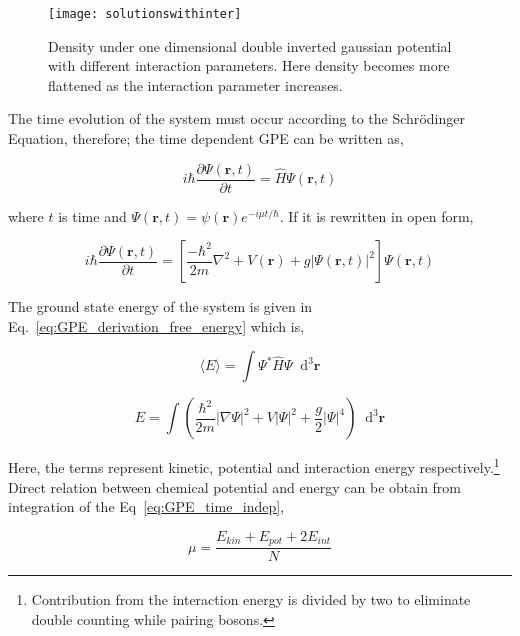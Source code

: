 \documentclass[a4paper,times,hidelinks,12pt]{article}
\newcommand*\dif{\mathop{}\!\mathrm{d}}
\begin{document}
\graphicspath{{"../figs/potentials/"}}
\begin{figure}[H]
    \centering
    \texttt{[image: solutionswithinter]}
    \caption{Density under one dimensional double inverted gaussian potential with different interaction parameters. Here density becomes more flattened as the interaction parameter increases.}
\label{fig:gaussian_pot_and_density}
\end{figure}


\noindent The time evolution of the system must occur according to the Schr{\"o}dinger Equation, therefore; the time dependent GPE can be written as,

\begin{equation}
\label{eq:GPE_time_evolution}
i \hbar \frac{\partial\Psi(\boldsymbol{r}, t)}{\partial t} = \hat{H}\Psi(\boldsymbol{r}, t)
\end{equation}

\noindent  where $t$ is time and $\Psi(\boldsymbol{r}, t) = \psi(\boldsymbol{r})e^{-i\mu t/\hbar} $. If it is rewritten in open form,

\begin{equation}
\label{eq:GPE_time_indep}
i \hbar \frac{\partial\Psi(\boldsymbol{r}, t)}{\partial t} = \left[\frac{-\hbar^2}{2m}\nabla^2 + V(\boldsymbol{r}) + g|\Psi(\boldsymbol{r}, t)|^2 \right] \Psi(\boldsymbol{r}, t)
\end{equation}

\noindent The ground state energy of the system is given in Eq.~\eqref{eq:GPE_derivation_free_energy} which is,

\begin{equation}
\label{eq:GPE_total_energy_general}
\langle E \rangle = \int \Psi^{*}\hat{H}\Psi \dif^3\boldsymbol{r}
\end{equation}

\begin{equation}
\label{eq:GPE_total_energy}
E = \int \left(\frac {\hbar^2}{2m}|\nabla
\Psi|^2 + V|\Psi|^2 + \frac{g}{2}|\Psi|^4 \right) \dif^3 \boldsymbol{r}
\end{equation}

\noindent Here, the terms represent kinetic, potential and interaction energy respectively.\footnote{Contribution from the interaction energy is divided by two to eliminate double counting while pairing bosons.} Direct relation between chemical potential and energy can be obtain from integration of the Eq~\eqref{eq:GPE_time_indep}, 

\begin{equation}
\label{eq:mu_and_total_en}
\mu = \frac{E_{kin} + E_{pot} + 2E_{int}}{N}
\end{equation}
\end{document}
